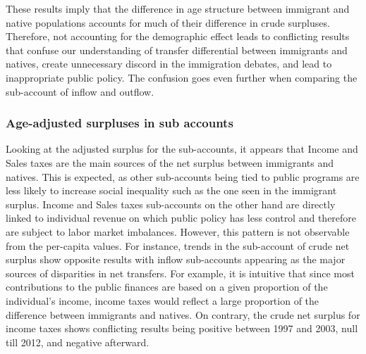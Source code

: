 \vspace{0.7em}\par
These results imply that the difference in age structure between immigrant and native populations accounts for much of their difference in crude surpluses.
Therefore, not accounting for the demographic effect leads to conflicting results that confuse our understanding of transfer differential between immigrants and natives, create unnecessary discord in the immigration debates, and lead to inappropriate public policy.
The confusion goes even further when comparing the sub-account of inflow and outflow.


\subsubsection*{Age-adjusted surpluses in sub accounts}

Looking at the adjusted surplus for the sub-accounts, it appears that Income and Sales taxes are the main sources of the net surplus between immigrants and natives.
This is expected, as other sub-accounts being tied to public programs are less likely to increase social inequality such as the one seen in the immigrant surplus.
Income and Sales taxes sub-accounts on the other hand are directly linked to individual revenue on which public policy has less control and therefore are subject to labor market imbalances.
However, this pattern is not observable from the per-capita values.
For instance, trends in the sub-account of crude net surplus show opposite results with inflow sub-accounts appearing as the major sources of disparities in net transfers.
For example, it is intuitive that since most contributions to the public finances are based on a given proportion of the individual's income, income taxes would reflect a large proportion of the difference between immigrants and natives.
On contrary, the crude net surplus for income taxes shows conflicting results being positive between 1997 and 2003, null till 2012, and negative afterward.

